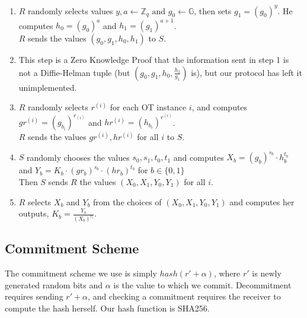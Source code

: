\documentclass{article}
\begin{document}
\begin{enumerate}
	\item $R$ randomly selects values $y,a \leftarrow \mathbb{Z}_{q} \text{ and } g_{0} \leftarrow \mathbb{G}$, then sets $g_{1}=(g_{0})^{y}$. He computes $h_{0} = (g_{0})^{a}$ and $h_{1} = (g_{1})^{a + 1}$. \\
	$R$ sends the values $(g_{0},g_{1},h_{0}, h_{1})$ to $S$.
	\item This step is a Zero Knowledge Proof that the information sent in step 1 is not a Diffie-Helman tuple (but $(g_{0},g_{1},h_{0}, \frac{h_{1}}{g_{1}})$ is), but our protocol has left it unimplemented.
	\item $R$ randomly selects $r^{(i)}$ for each OT instance $i$, and computes $gr^{(i)} = (g_{b_i})^{r_{(i)}}$ and $hr^{(i)}= (h_{b_{i}})^{r^{(i)}}$. \\
	 $R$ sends the values $gr^{(i)}, hr^{(i)}$ for all $i$ to $S$. 
	\item $S$ randomly chooses the values $s_{0},s_{1},t_{0},t_{1}$ and computes $X_{b} = (g_{b})^{s_{b}} \cdot h_{b}^{t_{b}}$ and $Y_{b} = K_{b} \cdot (gr_{b})^{s_{b}} \cdot (hr_{b})^{t_{b}}$ for $b \in \{0,1\}$\\
	Then $S$ sends $R$ the values $(X_{0},X_{1},Y_{0},Y_{1})$ for all $i$.
	\item $R$ selects $X_{b}$ and $Y_{b}$ from the choices of $(X_{0},X_{1},Y_{0},Y_{1})$ and computes her outputs, $K_{b} = \frac{Y_{b}}{(X_{b})^{r_i}}$.
\end{enumerate}


\subsection{Commitment Scheme} \label{comm-scheme}
The commitment scheme we use is simply $hash(r' + \alpha)$, where $r'$ is newly generated random bits and $\alpha$ is the value to which we commit. Decommitment requires sending $r' + \alpha$, and checking a commitment requires the receiver to compute the hash herself. Our hash function is SHA256.
\end{document}
